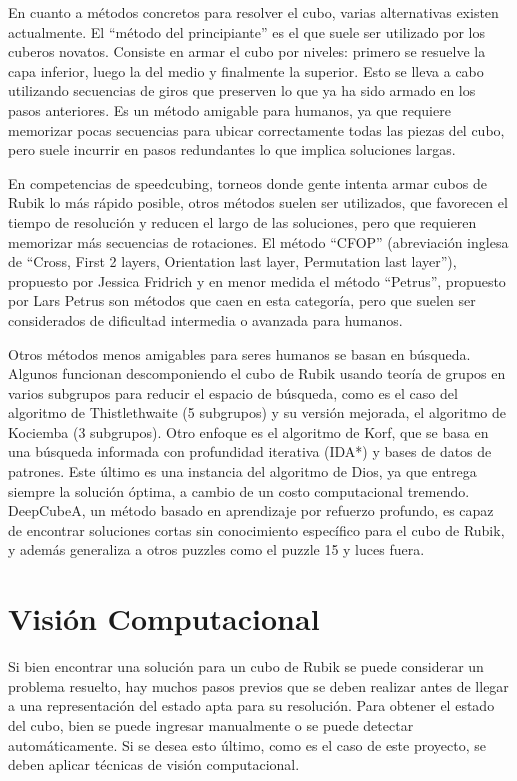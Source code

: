 En cuanto a métodos concretos para resolver el cubo, varias alternativas existen actualmente. El ``método del principiante''\cite{beginner} es el que suele ser utilizado por los cuberos novatos. Consiste en armar el cubo por niveles: primero se resuelve la capa inferior, luego la del medio y finalmente la superior. Esto se lleva a cabo utilizando secuencias de giros que preserven lo que ya ha sido armado en los pasos anteriores. Es un método amigable para humanos, ya que requiere memorizar pocas secuencias para ubicar correctamente todas las piezas del cubo, pero suele incurrir en pasos redundantes lo que implica soluciones largas.

En competencias de speedcubing, torneos donde gente intenta armar cubos de Rubik lo más rápido posible, otros métodos suelen ser utilizados, que favorecen el tiempo de resolución y reducen el largo de las soluciones, pero que requieren memorizar más secuencias de rotaciones. El método ``CFOP'' (abreviación inglesa de ``Cross, First 2 layers, Orientation last layer, Permutation last layer''), propuesto por Jessica Fridrich\cite{fridrich} y en menor medida el método ``Petrus'', propuesto por Lars Petrus\cite{petrus} son métodos que caen en esta categoría, pero que suelen ser considerados de dificultad intermedia o avanzada para humanos.

Otros métodos menos amigables para seres humanos se basan en búsqueda. Algunos funcionan descomponiendo el cubo de Rubik usando teoría de grupos en varios subgrupos para reducir el espacio de búsqueda, como es el caso del algoritmo de Thistlethwaite\cite{thistlethwaite} (5 subgrupos) y su versión mejorada, el algoritmo de Kociemba\cite{kociemba} (3 subgrupos). Otro enfoque es el algoritmo de Korf\cite{korf}, que se basa en una búsqueda informada con profundidad iterativa (IDA*)\cite{ida} y bases de datos de patrones\cite{patterndatabases}. Este último es una instancia del algoritmo de Dios, ya que entrega siempre la solución óptima, a cambio de un costo computacional tremendo\cite{korfcomplexity}. DeepCubeA\cite{deepcube}, un método basado en aprendizaje por refuerzo profundo, es capaz de encontrar soluciones cortas sin conocimiento específico para el cubo de Rubik, y además generaliza a otros puzzles como el puzzle 15 y luces fuera.


\section*{Visión Computacional}
Si bien encontrar una solución para un cubo de Rubik se puede considerar un problema resuelto, hay muchos pasos previos que se deben realizar antes de llegar a una representación del estado apta para su resolución. Para obtener el estado del cubo, bien se puede ingresar manualmente o se puede detectar automáticamente. Si se desea esto último, como es el caso de este proyecto, se deben aplicar técnicas de visión computacional.

